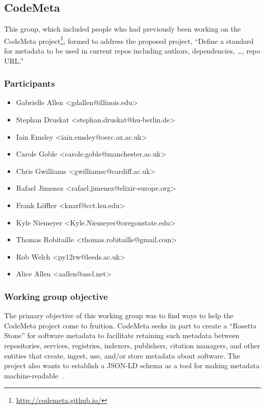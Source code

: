 \subsection{CodeMeta}
\label{sec:CodeMeta}


This group, which included people who had previously been working on the CodeMeta project\footnote{\url{http://codemeta.github.io/}}, formed to address the proposed project,
 ``Define a standard for metadata to be used in current repos including authors, dependencies, \dots{}, repo URL.''

\subsubsection{Participants}

\begin{itemize}
\item Gabrielle Allen <gdallen@illinois.edu>
\item Stephan Druskat <stephan.druskat@hu-berlin.de>
\item Iain Emsley <iain.emsley@oerc.ox.ac.uk>
\item Carole Goble <carole.goble@manchester.ac.uk>
\item Chris Gwilliams <gwilliamsc@cardiff.ac.uk>
\item Rafael Jimenez <rafael.jimenez@elixir-europe.org>
\item Frank L\"{o}ffler <knarf@cct.lsu.edu>
\item Kyle Niemeyer <Kyle.Niemeyer@oregonstate.edu>
\item Thomas Robitaille <thomas.robitaille@gmail.com>
\item Rob Welch <py12rw@leeds.ac.uk>
\item Alice Allen <aallen@ascl.net>
\end{itemize}

\subsubsection{Working group objective}

The primary objective of this working group was to find ways to help the CodeMeta project come to fruition. CodeMeta seeks in part to create a ``Rosetta Stone'' for software metadata to facilitate retaining such metadata between repositories, services, registries, indexers, publishers, citation managers, and other entities that create, ingest, use, and/or store metadata about software. The project also wants to establish a JSON-LD schema as a tool for making metadata machine-readable~\cite{CodeMeta_schema}.

